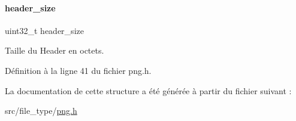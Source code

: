 \paragraph{\texorpdfstring{header\+\_\+size}{header\_size}}
{\footnotesize\ttfamily uint32\+\_\+t header\+\_\+size}

Taille du Header en octets. 

Définition à la ligne 41 du fichier png.\+h.



La documentation de cette structure a été générée à partir du fichier suivant \+:\begin{DoxyCompactItemize}
\item 
src/file\+\_\+type/\hyperlink{a00095}{png.\+h}\end{DoxyCompactItemize}
